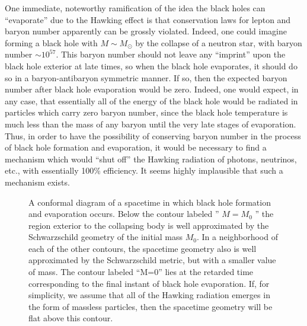 \documentclass[11pt,a4paper]{article}
\begin{document}
One immediate, noteworthy ramification of the idea the black holes can ``evaporate'' due to the Hawking effect is that conservation laws for lepton and baryon number apparently can be grossly violated. Indeed, one could imagine forming a black hole with \(M\sim M_\odot\) by the collapse of a neutron star, with baryon number \(\sim10^{57}\). This baryon number should not leave any ``imprint'' upon the black hole exterior at late times, so when the black hole evaporates, it should do so in a baryon-antibaryon symmetric manner. If so, then the expected baryon number after black hole evaporation would be zero. Indeed, one would expect, in any case, that essentially all of the energy of the black hole would be radiated in particles which carry zero baryon number, since the black hole temperature is much less \hypertarget{source-191}{} than the mass of any baryon until the very late stages of evaporation. Thus, in order to have the possibility of conserving baryon number in the process of black hole formation and evaporation, it would be necessary to find a mechanism which would ``shut off'' the Hawking radiation of photons, neutrinos, etc., with essentially 100\% efficiency. It seems highly implausible that such a mechanism exists.

\begin{figure}[htbp]
\centering
\renewcommand{\thefigure}{7.2}

\caption{A conformal diagram of a spacetime in which black hole formation and evaporation occurs. Below the contour labeled '' \(M=M_0\) '' the region exterior to the collapsing body is well approximated by the Schwarzschild geometry of the initial mass \(M_0\). In a neighborhood of each of the other contours, the spacetime geometry also is well approximated by the Schwarzschild metric, but with a smaller value of mass. The contour labeled ``M=0'' lies at the retarded time corresponding to the final instant of black hole evaporation. If, for simplicity, we assume that all of the Hawking radiation emerges in the form of massless particles, then the spacetime geometry will be flat above this contour.}\label{fig:7.2}
\end{figure}
\end{document}
